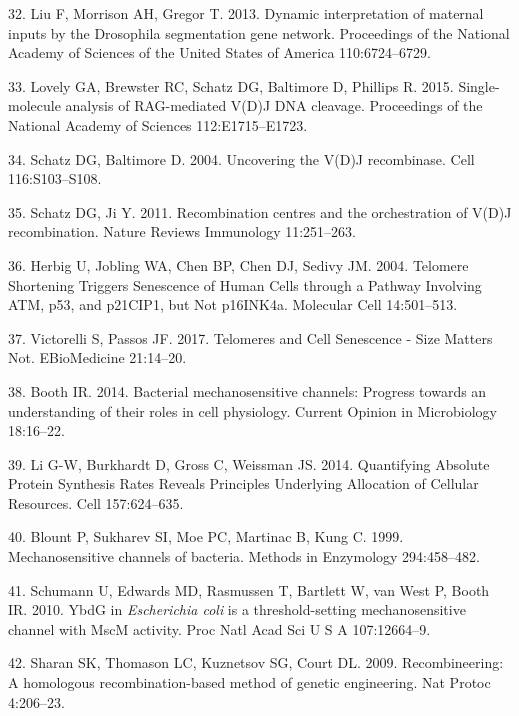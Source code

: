 \hypertarget{ref-liu2013}{}
32.
Liu F,
Morrison
AH,
Gregor
T.
2013.
Dynamic
interpretation
of
maternal
inputs
by the
Drosophila
segmentation
gene
network.
Proceedings
of the
National
Academy
of
Sciences
of the
United
States
of
America
110:6724--6729.

\hypertarget{ref-lovely2015}{}
33.
Lovely
GA,
Brewster
RC,
Schatz
DG,
Baltimore
D,
Phillips
R.
2015.
Single-molecule
analysis
of
RAG-mediated
V(D)J
DNA
cleavage.
Proceedings
of the
National
Academy
of
Sciences
112:E1715--E1723.

\hypertarget{ref-schatz2004}{}
34.
Schatz
DG,
Baltimore
D.
2004.
Uncovering
the
V(D)J
recombinase.
Cell
116:S103--S108.

\hypertarget{ref-schatz2011}{}
35.
Schatz
DG, Ji
Y.
2011.
Recombination
centres
and
the
orchestration
of
V(D)J
recombination.
Nature
Reviews
Immunology
11:251--263.

\hypertarget{ref-herbig2004}{}
36.
Herbig
U,
Jobling
WA,
Chen
BP,
Chen
DJ,
Sedivy
JM.
2004.
Telomere
Shortening
Triggers
Senescence
of
Human
Cells
through
a
Pathway
Involving
ATM,
p53,
and
p21CIP1,
but
Not
p16INK4a.
Molecular
Cell
14:501--513.

\hypertarget{ref-victorelli2017}{}
37.
Victorelli
S,
Passos
JF.
2017.
Telomeres
and
Cell
Senescence
- Size
Matters
Not.
EBioMedicine
21:14--20.

\hypertarget{ref-booth2014}{}
38.
Booth
IR.
2014.
Bacterial
mechanosensitive
channels:
Progress
towards
an
understanding
of
their
roles
in
cell
physiology.
Current
Opinion
in
Microbiology
18:16--22.

\hypertarget{ref-li2014}{}
39. Li
G-W,
Burkhardt
D,
Gross
C,
Weissman
JS.
2014.
Quantifying
Absolute
Protein
Synthesis
Rates
Reveals
Principles
Underlying
Allocation
of
Cellular
Resources.
Cell
157:624--635.

\hypertarget{ref-blount1999}{}
40.
Blount
P,
Sukharev
SI,
Moe
PC,
Martinac
B,
Kung
C.
1999.
Mechanosensitive
channels
of
bacteria.
Methods
in
Enzymology
294:458--482.

\hypertarget{ref-schumann2010}{}
41.
Schumann
U,
Edwards
MD,
Rasmussen
T,
Bartlett
W, van
West
P,
Booth
IR.
2010.
YbdG
in
\emph{Escherichia
coli}
is a
threshold-setting
mechanosensitive
channel
with
MscM
activity.
Proc
Natl
Acad
Sci U
S A
107:12664--9.

\hypertarget{ref-sharan2009}{}
42.
Sharan
SK,
Thomason
LC,
Kuznetsov
SG,
Court
DL.
2009.
Recombineering:
A
homologous
recombination-based
method
of
genetic
engineering.
Nat
Protoc
4:206--23.


